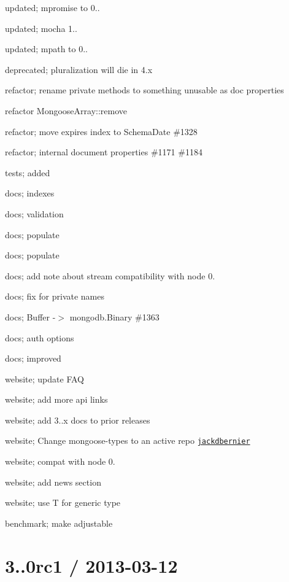 \begin{DoxyItemize}
\item updated; mpromise to 0..
\item updated; mocha 1..
\item updated; mpath to 0..
\item deprecated; pluralization will die in 4.\+x
\item refactor; rename private methods to something unusable as doc properties
\item refactor Mongoose\+Array\+::remove
\item refactor; move expires index to Schema\+Date \#1328
\item refactor; internal document properties \#1171 \#1184
\item tests; added
\item docs; indexes
\item docs; validation
\item docs; populate
\item docs; populate
\item docs; add note about stream compatibility with node 0.
\item docs; fix for private names
\item docs; Buffer -\/$>$ mongodb.\+Binary \#1363
\item docs; auth options
\item docs; improved
\item website; update F\+AQ
\item website; add more api links
\item website; add 3..\+x docs to prior releases
\item website; Change mongoose-\/types to an active repo \href{https://github.com/jackdbernier}{\tt jackdbernier}
\item website; compat with node 0.
\item website; add news section
\item website; use T for generic type
\item benchmark; make adjustable
\end{DoxyItemize}

\section*{3..\+0rc1 / 2013-\/03-\/12 }



